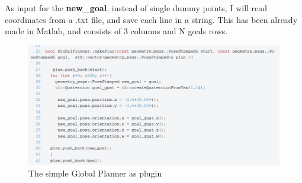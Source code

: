 \documentclass[11pt,a4paper]{article}
\begin{document}
\vline

As input for the \textbf{new{\_}goal}, instead of single dummy points, I will read coordinates from a .txt file, and save each line in a string. This has been already made in Matlab, and consists of 3 columns and N goals rows. 

\begin{figure}[!htb]
	\center
	\includegraphics[width=.8\textwidth]{figures/global_planner_ros.png}
	\caption{The simple Global Planner as plugin}
	\label{fig:global_plann}
\end{figure}
\end{document}
